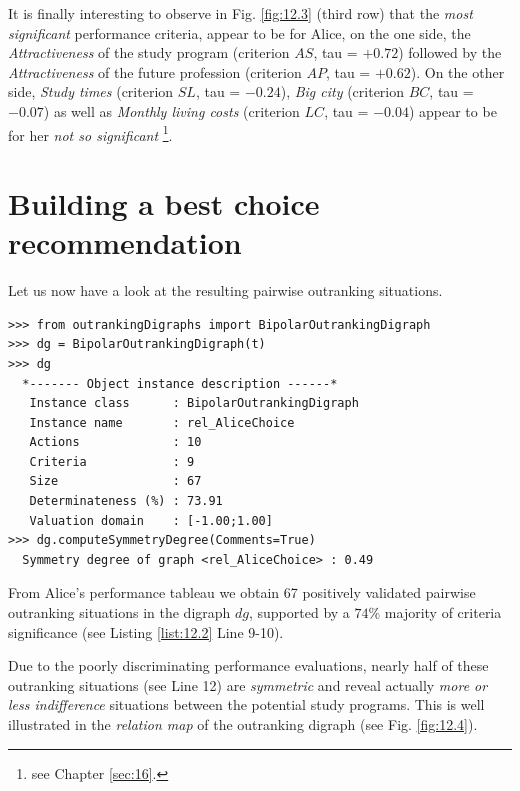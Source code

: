 It is finally interesting to observe in Fig. \ref{fig:12.3} (third row) that the \emph{most significant} performance criteria, appear to be for Alice, on the one side, the \emph{Attractiveness} of the study program (criterion $AS$, tau = $+0.72$) followed by the \emph{Attractiveness} of the future profession (criterion $AP$, tau = $+0.62$). On the other side, \emph{Study times} (criterion $SL$, tau = $-0.24$), \emph{Big city} (criterion $BC$, tau = $-0.07$) as well as \emph{Monthly living costs} (criterion $LC$, tau = $-0.04$) appear to be for her  \emph{not so significant} \footnote{see Chapter \ref{sec:16}.}.


\section{Building a best choice recommendation}
\label{sec:12.3}

Let us now have a look at the resulting pairwise outranking situations.

\begin{lstlisting}[caption={Computing Alice's outranking digraph},label=list:12.2]
>>> from outrankingDigraphs import BipolarOutrankingDigraph
>>> dg = BipolarOutrankingDigraph(t) 
>>> dg
  *------- Object instance description ------*
   Instance class      : BipolarOutrankingDigraph
   Instance name       : rel_AliceChoice
   Actions             : 10
   Criteria            : 9
   Size                : 67
   Determinateness (%) : 73.91
   Valuation domain    : [-1.00;1.00]
>>> dg.computeSymmetryDegree(Comments=True)
  Symmetry degree of graph <rel_AliceChoice> : 0.49
\end{lstlisting}

From Alice's performance tableau we obtain 67 positively validated pairwise outranking situations in the digraph $dg$, supported by a $74\%$ majority of criteria significance (see Listing \ref{list:12.2} Line 9-10).

Due to the poorly discriminating performance evaluations, nearly half of these outranking situations (see Line 12) are \emph{symmetric} and reveal actually \emph{more or less indifference} situations between the potential study programs. This is well illustrated in the \emph{relation map} of the outranking digraph (see Fig. \ref{fig:12.4}).

